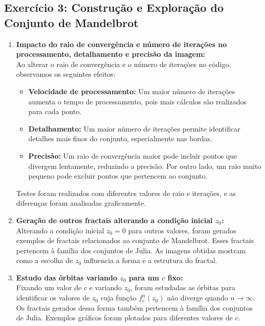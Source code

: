 


\subsection*{Exercício 3: Construção e Exploração do Conjunto de Mandelbrot}


\begin{enumerate}[label=(\alph*)]
    \item \textbf{Impacto do raio de convergência e número de iterações no processamento, detalhamento e precisão da imagem:} \\
    
        Ao alterar o raio de convergência e o número de iterações no código, observamos os seguintes efeitos:
        \begin{itemize}
            \item \textbf{Velocidade de processamento:} Um maior número de iterações aumenta o tempo de processamento, pois mais cálculos são realizados para cada ponto.
            \item \textbf{Detalhamento:} Um maior número de iterações permite identificar detalhes mais finos do conjunto, especialmente nas bordas.
            \item \textbf{Precisão:} Um raio de convergência maior pode incluir pontos que divergem lentamente, reduzindo a precisão. Por outro lado, um raio muito pequeno pode excluir pontos que pertencem ao conjunto.
        \end{itemize}
        Testes foram realizados com diferentes valores de raio e iterações, e as diferenças foram analisadas graficamente.

    \item \textbf{Geração de outros fractais alterando a condição inicial \( z_0 \):} \\
    
        Alterando a condição inicial \( z_0 = 0 \) para outros valores, foram gerados exemplos de fractais relacionados ao conjunto de Mandelbrot. Esses fractais pertencem à família dos conjuntos de Julia. As imagens obtidas mostram como a escolha de \( z_0 \) influencia a forma e a estrutura do fractal.

    \item \textbf{Estudo das órbitas variando \( z_0 \) para um \( c \) fixo:} \\
    
        Fixando um valor de \( c \) e variando \( z_0 \), foram estudadas as órbitas para identificar os valores de \( z_0 \) cuja função \( f_c^n(z_0) \) não diverge quando \( n \to \infty \). Os fractais gerados dessa forma também pertencem à família dos conjuntos de Julia. Exemplos gráficos foram plotados para diferentes valores de \( c \).


\end{enumerate}

